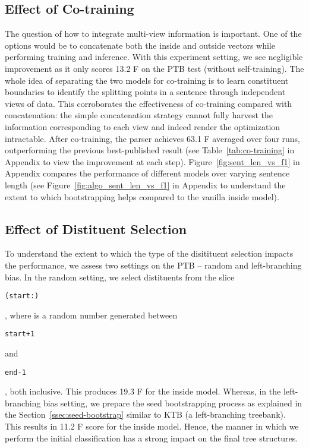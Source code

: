 \documentclass[11pt]{article}
\newcommand{\ptb}{\textsc{PTB}}
\newcommand{\ktb}{\textsc{KTB}}
\begin{document}
\subsection{Effect of Co-training}
\label{ssec:effect-of-cotraining}
The question of how to integrate multi-view information is important. One of the options would be to concatenate both the inside and outside vectors while performing training and inference. With this experiment setting, we see negligible improvement as it only scores 13.2 F on the PTB test (without self-training). The whole idea of separating the two models for co-training is to learn constituent boundaries to identify the splitting points in a sentence through independent views of data. This  corroborates the effectiveness of co-training compared with concatenation: the simple concatenation strategy cannot fully harvest the information corresponding to each view and indeed render the optimization intractable. After co-training, the parser achieves 63.1 F averaged over four runs, outperforming the previous best-published result (see Table~\ref{tab:co-training} in Appendix to view the improvement at each step). Figure~\ref{fig:sent_len_vs_f1} in Appendix compares the performance of different models over varying sentence length (see Figure~\ref{fig:algo_sent_len_vs_f1} in Appendix to understand the extent to which bootstrapping helps compared to the vanilla inside model).


\subsection{Effect of Distituent Selection}
\label{ssec:effect-of-dist-select}
To understand the extent to which the type of the disitituent selection impacts the performance, we assess two settings on the \ptb{} -- random and left-branching bias. In the random setting, we select distituents from the slice \begin{small}\texttt{(start:)}\end{small}, where  is a random number generated between \begin{small}\texttt{start+1}\end{small} and \begin{small}\texttt{end-1}\end{small}, both inclusive. This produces 19.3 F for the inside model. Whereas, in the left-branching bias setting, we prepare the seed bootstrapping process as explained in the Section~\ref{ssec:seed-bootstrap} similar to \ktb{} (a left-branching treebank). This results in 11.2 F score for the inside model. Hence, the manner in which we perform the initial classification has a strong impact on the final tree structures.
\end{document}
